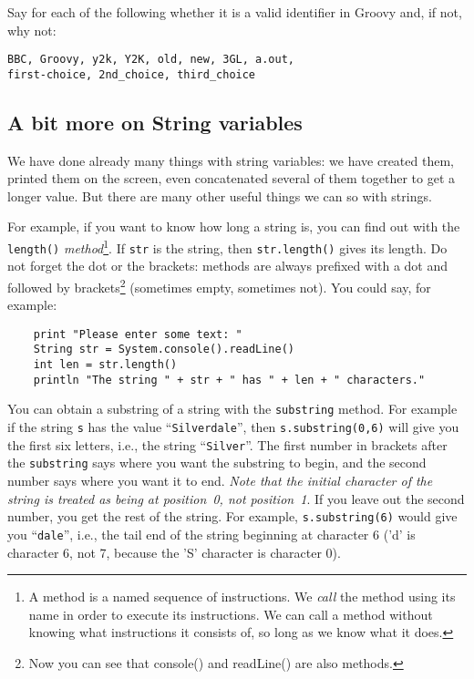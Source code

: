 Say for each of the following whether it is a valid identifier
in Groovy and, if not, why not:
\begin{Verbatim}
BBC, Groovy, y2k, Y2K, old, new, 3GL, a.out, 
first-choice, 2nd_choice, third_choice
\end{Verbatim}

\subsection{A bit more on String variables}

We have done already many things with string variables: we have
created them, printed them on the screen, even concatenated several of
them together to get a longer value. But there are many other useful
things we can so with strings. 

For example, if you want to know how long a string is, you can find
out with the \verb!length()! 
{\em method}\footnote{A method is a named sequence of instructions. We 
{\em call} the method using its name in order to execute its instructions.
We can call a method without knowing what instructions it consists of, so
long as we know what it does.}. 
If  \verb!str! is the string, then \verb!str.length()! gives its 
length. Do not forget the dot or the brackets: methods are always 
prefixed with a dot and followed by brackets\footnote{Now you can see that
  console() and readLine() are also methods.} (sometimes empty,
sometimes not). You could say, for example:

\begin{Verbatim}
    print "Please enter some text: "
    String str = System.console().readLine()
    int len = str.length()
    println "The string " + str + " has " + len + " characters."
\end{Verbatim}

You can obtain a substring of a string with the \verb!substring! method.
For example if the string \verb!s! has the value ``\verb!Silverdale!'', then
\verb!s.substring(0,6)! will give you the first six letters, i.e., the string
``\verb!Silver!''.  The first number in brackets after the \verb!substring!
says where you want the substring to begin, and the second number says
where you want it to end. \emph{Note that the initial character of the string
is treated as being at position~0, not position~1}.  If you leave out the second number,
you get the rest of the string.  For example, \verb!s.substring(6)! would
give you ``\verb!dale!'', i.e., the tail end of the string beginning at
character 6 ('d' is character 6, not 7, because the 'S' character is
character 0). 

